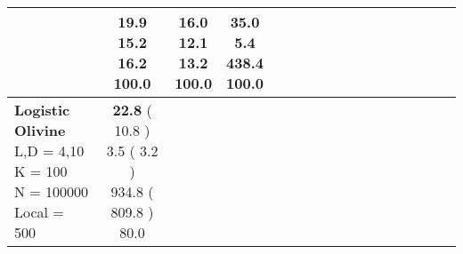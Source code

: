 \documentclass[9pt]{article}
\begin{document}
\begin{landscape}
\begin{longtable}{ l | c c c c | c c c c | c c c c | c c c c |}
             &
                            \makecell{              19.9
     \\
            {\footnotesize             15.2
    } \\  {\footnotesize             16.2
     } \\
            {\small \textcolor[rgb]{ 0.2 , 0.7 , 0.1} {100.0  }
} }
             &                         \makecell{              16.0
     \\
            {\footnotesize             12.1
    } \\  {\footnotesize             13.2
     } \\
            {\small \textcolor[rgb]{ 0.2 , 0.7 , 0.1} {100.0  }
} }
             &
                            \makecell{              35.0
     \\
            {\footnotesize             \textbf{ 5.4 }
    } \\  {\footnotesize             438.4
     } \\
            {\small \textcolor[rgb]{ 0.2 , 0.7 , 0.1} {100.0  }
} }
            

 \\
                                                            
                    \hline
                    \makecell{ \textbf{ Logistic Olivine} \\
                    { \small L,D = 4,10} \\
                    {\small K = 100} \\
                    {\small N = 100000 } \\ {\small Local = 500 }} &
                    
                            \makecell{              \textbf{ 22.8 }
     (             10.8
    ) \\
            {\footnotesize             3.5
     (              3.2
     )} \\
            {\footnotesize             934.8
     (            809.8
    ) } \\
            {\small  \textcolor[rgb]{ 0.6 , 0.3 , 0.1} {80.0  }
} }



\end{longtable}
\end{landscape}
\end{document}
